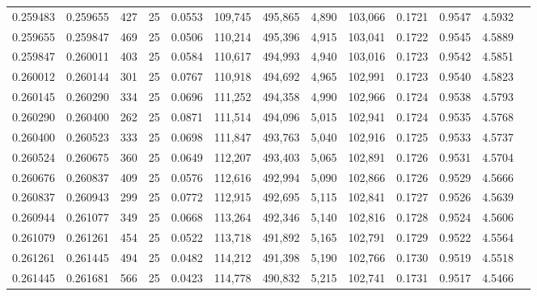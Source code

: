 \begin{tabular}{rrrrrrrrrrrrr}
0.259483 & 0.259655 &   427 &  25 &                                     0.0553 & 109,745 & 495,865 &   4,890 & 103,066 & 0.1721 & 0.9547 & 4.5932 \\
0.259655 & 0.259847 &   469 &  25 &                                     0.0506 & 110,214 & 495,396 &   4,915 & 103,041 & 0.1722 & 0.9545 & 4.5889 \\
0.259847 & 0.260011 &   403 &  25 &                                     0.0584 & 110,617 & 494,993 &   4,940 & 103,016 & 0.1723 & 0.9542 & 4.5851 \\
0.260012 & 0.260144 &   301 &  25 &                                     0.0767 & 110,918 & 494,692 &   4,965 & 102,991 & 0.1723 & 0.9540 & 4.5823 \\
0.260145 & 0.260290 &   334 &  25 &                                     0.0696 & 111,252 & 494,358 &   4,990 & 102,966 & 0.1724 & 0.9538 & 4.5793 \\
0.260290 & 0.260400 &   262 &  25 &                                     0.0871 & 111,514 & 494,096 &   5,015 & 102,941 & 0.1724 & 0.9535 & 4.5768 \\
0.260400 & 0.260523 &   333 &  25 &                                     0.0698 & 111,847 & 493,763 &   5,040 & 102,916 & 0.1725 & 0.9533 & 4.5737 \\
0.260524 & 0.260675 &   360 &  25 &                                     0.0649 & 112,207 & 493,403 &   5,065 & 102,891 & 0.1726 & 0.9531 & 4.5704 \\
0.260676 & 0.260837 &   409 &  25 &                                     0.0576 & 112,616 & 492,994 &   5,090 & 102,866 & 0.1726 & 0.9529 & 4.5666 \\
0.260837 & 0.260943 &   299 &  25 &                                     0.0772 & 112,915 & 492,695 &   5,115 & 102,841 & 0.1727 & 0.9526 & 4.5639 \\
0.260944 & 0.261077 &   349 &  25 &                                     0.0668 & 113,264 & 492,346 &   5,140 & 102,816 & 0.1728 & 0.9524 & 4.5606 \\
0.261079 & 0.261261 &   454 &  25 &                                     0.0522 & 113,718 & 491,892 &   5,165 & 102,791 & 0.1729 & 0.9522 & 4.5564 \\
0.261261 & 0.261445 &   494 &  25 &                                     0.0482 & 114,212 & 491,398 &   5,190 & 102,766 & 0.1730 & 0.9519 & 4.5518 \\
0.261445 & 0.261681 &   566 &  25 &                                     0.0423 & 114,778 & 490,832 &   5,215 & 102,741 & 0.1731 & 0.9517 & 4.5466 \\

\end{tabular}
